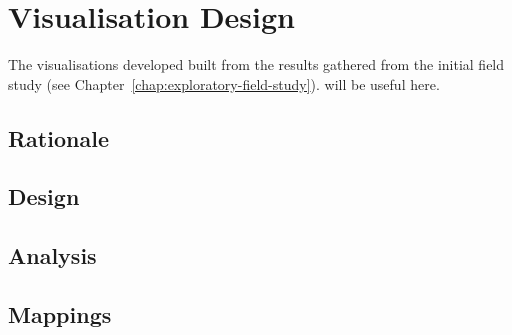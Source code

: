 
\chapter{Visualisation Design}
\label{chap:visualisation-design}

The visualisations developed built from the results gathered from the initial field study (see Chapter~\ref{chap:exploratory-field-study}).
{\color{red}\cite{Ware2013a,McLean2010a,Purchase1996} will be useful here.}

\section{Rationale}

\section{Design}

\section{Analysis}

\section{Mappings}